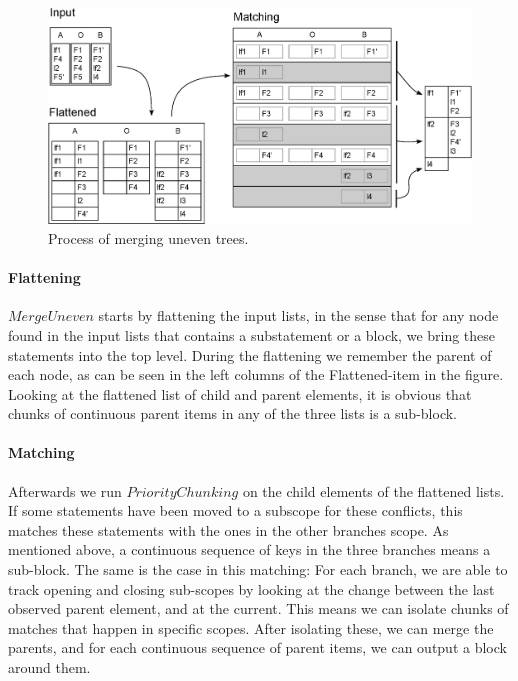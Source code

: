 \documentclass[11pt]{article}
\begin{document}
\begin{figure}
   \centerline{\includegraphics[scale=0.55]{drawings/html/EditedFlattenedMerge.eps}}
   \caption{Process of merging uneven trees.}
   \label{UeventreeProcess}
\end{figure}

\paragraph{Flattening} $MergeUneven$ starts by flattening the input lists, in the sense that for any node found in the input lists that contains a substatement or a block, we bring these statements into the top level. During the flattening we remember the parent of each node, as can be seen in the left columns of the Flattened-item in the figure. Looking at the flattened list of child and parent elements,  it is obvious that chunks of continuous parent items in any of the three lists is a sub-block.

\paragraph{Matching} Afterwards we run $PriorityChunking$ on the child elements of the flattened lists. If some statements have been moved to a subscope for these conflicts, this matches these statements with the ones in the other branches scope. As mentioned above, a continuous sequence of keys in the three branches means a sub-block. The same is the case in this matching: For each branch, we are able to track opening and closing sub-scopes by looking at the change between the last observed parent element, and at the current. This means we can isolate chunks of matches that happen in specific scopes. After isolating these, we can merge the parents, and for each continuous sequence of parent items, we can output a block around them.
\end{document}
